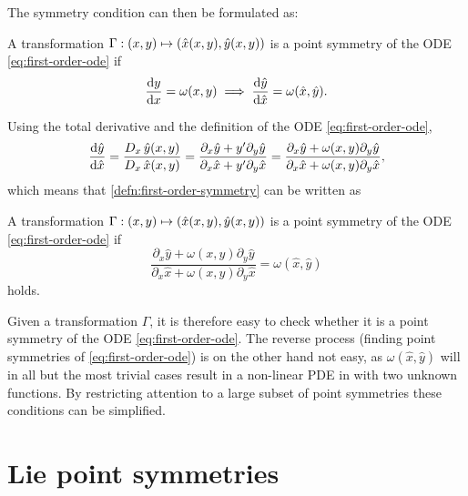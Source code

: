 The symmetry condition can then be formulated as: %
\begin{defn} \label{defn:first-order-symmetry}
  A transformation \(\Gamma: \pqty{x,y} \mapsto \pqty{\hat{x}(x,y), \hat{y}(x,y)}\) is a point symmetry of the ODE \ref{eq:first-order-ode} if
  \begin{equation}
    \dv{y}{x} = \omega(x,y)
    \implies
    \dv{\hat{y}}{\hat{x}} = \omega(\hat{x},\hat{y}).
  \end{equation}
\end{defn}
Using the total derivative and the definition of the ODE \ref{eq:first-order-ode},
\begin{equation}
  \dv{\hat{y}}{\hat{x}} = 
  \frac{D_{x}\, \hat{y}(x,y)}{D_{x}\, \hat{x}(x,y)} =
  \frac{\partial_x \hat{y} + y' \partial_y \hat{y}}{\partial_x \hat{x} + y' \partial_y \hat{x}} =
  \frac{\partial_x \hat{y} + \omega(x,y) \partial_y \hat{y}}{\partial_x \hat{x} + \omega(x,y) \partial_y \hat{x}},
\end{equation}
which means that \cref{defn:first-order-symmetry} can be written as
\begin{lem} \label{lem:simple-first-order-symmetry}
  A transformation \(\Gamma: \pqty{x,y} \mapsto \pqty{\hat{x}(x,y), \hat{y}(x,y)}\) is a point symmetry of the ODE \ref{eq:first-order-ode} if
  \begin{equation} \label{eq:simple-first-order-symmetry}
    \frac{\partial_x \hat{y} + \omega(x,y) \partial_y \hat{y}}{\partial_x \hat{x} + \omega(x,y) \partial_y \hat{x}} = \omega(\hat{x},\hat{y})
  \end{equation}
  holds.
\end{lem} %
Given a transformation \(\Gamma\), it is therefore easy to check whether it is a point symmetry of the ODE \ref{eq:first-order-ode}.
The reverse process (finding point symmetries of \cref{eq:first-order-ode}) is on the other hand not easy, as \(\omega(\hat{x},\hat{y})\) will in all but the most trivial cases result in a non-linear PDE in with two unknown functions.
By restricting attention to a large subset of point symmetries these conditions can be simplified.

\section{Lie point symmetries}

